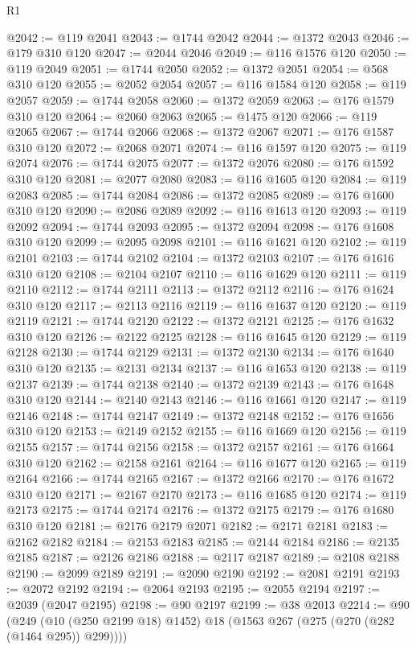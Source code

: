 \begin{lexlean}{R1}
\begin{coremodule}
@2042 := @119 @2041
@2043 := @1744 @2042
@2044 := @1372 @2043
@2046 := @179 @310 @120
@2047 := @2044 @2046
@2049 := @116 @1576 @120
@2050 := @119 @2049
@2051 := @1744 @2050
@2052 := @1372 @2051
@2054 := @568 @310 @120
@2055 := @2052 @2054
@2057 := @116 @1584 @120
@2058 := @119 @2057
@2059 := @1744 @2058
@2060 := @1372 @2059
@2063 := @176 @1579 @310 @120
@2064 := @2060 @2063
@2065 := @1475 @120
@2066 := @119 @2065
@2067 := @1744 @2066
@2068 := @1372 @2067
@2071 := @176 @1587 @310 @120
@2072 := @2068 @2071
@2074 := @116 @1597 @120
@2075 := @119 @2074
@2076 := @1744 @2075
@2077 := @1372 @2076
@2080 := @176 @1592 @310 @120
@2081 := @2077 @2080
@2083 := @116 @1605 @120
@2084 := @119 @2083
@2085 := @1744 @2084
@2086 := @1372 @2085
@2089 := @176 @1600 @310 @120
@2090 := @2086 @2089
@2092 := @116 @1613 @120
@2093 := @119 @2092
@2094 := @1744 @2093
@2095 := @1372 @2094
@2098 := @176 @1608 @310 @120
@2099 := @2095 @2098
@2101 := @116 @1621 @120
@2102 := @119 @2101
@2103 := @1744 @2102
@2104 := @1372 @2103
@2107 := @176 @1616 @310 @120
@2108 := @2104 @2107
@2110 := @116 @1629 @120
@2111 := @119 @2110
@2112 := @1744 @2111
@2113 := @1372 @2112
@2116 := @176 @1624 @310 @120
@2117 := @2113 @2116
@2119 := @116 @1637 @120
@2120 := @119 @2119
@2121 := @1744 @2120
@2122 := @1372 @2121
@2125 := @176 @1632 @310 @120
@2126 := @2122 @2125
@2128 := @116 @1645 @120
@2129 := @119 @2128
@2130 := @1744 @2129
@2131 := @1372 @2130
@2134 := @176 @1640 @310 @120
@2135 := @2131 @2134
@2137 := @116 @1653 @120
@2138 := @119 @2137
@2139 := @1744 @2138
@2140 := @1372 @2139
@2143 := @176 @1648 @310 @120
@2144 := @2140 @2143
@2146 := @116 @1661 @120
@2147 := @119 @2146
@2148 := @1744 @2147
@2149 := @1372 @2148
@2152 := @176 @1656 @310 @120
@2153 := @2149 @2152
@2155 := @116 @1669 @120
@2156 := @119 @2155
@2157 := @1744 @2156
@2158 := @1372 @2157
@2161 := @176 @1664 @310 @120
@2162 := @2158 @2161
@2164 := @116 @1677 @120
@2165 := @119 @2164
@2166 := @1744 @2165
@2167 := @1372 @2166
@2170 := @176 @1672 @310 @120
@2171 := @2167 @2170
@2173 := @116 @1685 @120
@2174 := @119 @2173
@2175 := @1744 @2174
@2176 := @1372 @2175
@2179 := @176 @1680 @310 @120
@2181 := @2176 @2179 @2071
@2182 := @2171 @2181
@2183 := @2162 @2182
@2184 := @2153 @2183
@2185 := @2144 @2184
@2186 := @2135 @2185
@2187 := @2126 @2186
@2188 := @2117 @2187
@2189 := @2108 @2188
@2190 := @2099 @2189
@2191 := @2090 @2190
@2192 := @2081 @2191
@2193 := @2072 @2192
@2194 := @2064 @2193
@2195 := @2055 @2194
@2197 := @2039 (@2047 @2195)
@2198 := @90 @2197
@2199 := @38 @2013
@2214 := @90
    (@249 (@10 (@250 @2199 @18) @1452) @18 (@1563 @267 (@275 (@270 (@282 (@1464 @295)) @299))))

\end{coremodule}
\end{lexlean}
